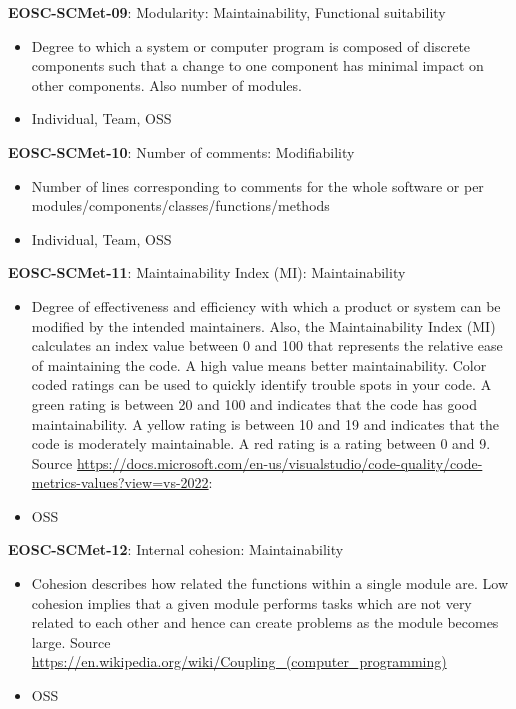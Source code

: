 \textbf{EOSC-SCMet-09}: Modularity: Maintainability, Functional suitability

\begin{itemize}
    \item Degree to which a system or computer program is composed of discrete components such that a change to
one component has minimal impact on other components. Also number of modules. \cite{iso_25010_2011_2017,montagud_systematic_2012,aberdour_achieving_2007,ogasawara_experiences_1996,shepherdson_cessda_2019}
    \item Individual, Team, OSS
\end{itemize}

\textbf{EOSC-SCMet-10}: Number of comments: Modifiability

\begin{itemize}
    \item Number of lines corresponding to comments for the whole software or per modules/components/classes/functions/methods \cite{srisopha_software_2018,montagud_systematic_2012,ogasawara_experiences_1996}
    \item Individual, Team, OSS
\end{itemize}

\textbf{EOSC-SCMet-11}: Maintainability Index (MI): Maintainability

\begin{itemize}
    \item Degree of effectiveness and efficiency with which a product or system can be modified by the intended
maintainers. Also, the Maintainability Index (MI) calculates an index value between 0 and 100 that represents the relative ease of maintaining the code. A high value means better maintainability. Color coded ratings can be used to quickly identify trouble spots in your code. A green rating is between 20 and 100 and indicates that the code has good maintainability. A yellow rating is between 10 and 19 and indicates that the code is moderately maintainable. A red rating is a rating between 0 and 9. Source \url{https://docs.microsoft.com/en-us/visualstudio/code-quality/code-metrics-values?view=vs-2022}:  \cite{iso_25010_2011_2017,montagud_systematic_2012}
    \item OSS
\end{itemize}

\textbf{EOSC-SCMet-12}: Internal cohesion: Maintainability

\begin{itemize}
    \item Cohesion describes how related the functions within a single module are. Low cohesion implies that a given module performs tasks which are not very related to each other and hence can create problems as the module becomes large. Source \url{https://en.wikipedia.org/wiki/Coupling_(computer_programming)} \cite{iso_central_secretary_isoiecieee_2010,montagud_systematic_2012}
    \item OSS
\end{itemize}

